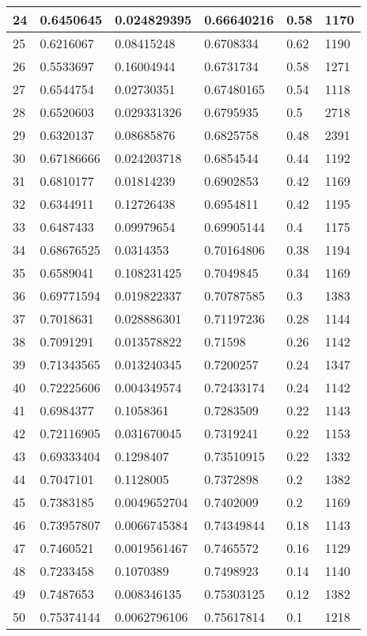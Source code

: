 \begin{longtable}{|l|l|l|l|l|l|}
24 & 0.6450645 & 0.024829395 & 0.66640216 & 0.58 & 1170 \\ \hline 
25 & 0.6216067 & 0.08415248 & 0.6708334 & 0.62 & 1190 \\ \hline 
26 & 0.5533697 & 0.16004944 & 0.6731734 & 0.58 & 1271 \\ \hline 
27 & 0.6544754 & 0.02730351 & 0.67480165 & 0.54 & 1118 \\ \hline 
28 & 0.6520603 & 0.029331326 & 0.6795935 & 0.5 & 2718 \\ \hline 
29 & 0.6320137 & 0.08685876 & 0.6825758 & 0.48 & 2391 \\ \hline 
30 & 0.67186666 & 0.024203718 & 0.6854544 & 0.44 & 1192 \\ \hline 
31 & 0.6810177 & 0.01814239 & 0.6902853 & 0.42 & 1169 \\ \hline 
32 & 0.6344911 & 0.12726438 & 0.6954811 & 0.42 & 1195 \\ \hline 
33 & 0.6487433 & 0.09979654 & 0.69905144 & 0.4 & 1175 \\ \hline 
34 & 0.68676525 & 0.0314353 & 0.70164806 & 0.38 & 1194 \\ \hline 
35 & 0.6589041 & 0.108231425 & 0.7049845 & 0.34 & 1169 \\ \hline 
36 & 0.69771594 & 0.019822337 & 0.70787585 & 0.3 & 1383 \\ \hline 
37 & 0.7018631 & 0.028886301 & 0.71197236 & 0.28 & 1144 \\ \hline 
38 & 0.7091291 & 0.013578822 & 0.71598 & 0.26 & 1142 \\ \hline 
39 & 0.71343565 & 0.013240345 & 0.7200257 & 0.24 & 1347 \\ \hline 
40 & 0.72225606 & 0.004349574 & 0.72433174 & 0.24 & 1142 \\ \hline 
41 & 0.6984377 & 0.1058361 & 0.7283509 & 0.22 & 1143 \\ \hline 
42 & 0.72116905 & 0.031670045 & 0.7319241 & 0.22 & 1153 \\ \hline 
43 & 0.69333404 & 0.1298407 & 0.73510915 & 0.22 & 1332 \\ \hline 
44 & 0.7047101 & 0.1128005 & 0.7372898 & 0.2 & 1382 \\ \hline 
45 & 0.7383185 & 0.0049652704 & 0.7402009 & 0.2 & 1169 \\ \hline 
46 & 0.73957807 & 0.0066745384 & 0.74349844 & 0.18 & 1143 \\ \hline 
47 & 0.7460521 & 0.0019561467 & 0.7465572 & 0.16 & 1129 \\ \hline 
48 & 0.7233458 & 0.1070389 & 0.7498923 & 0.14 & 1140 \\ \hline 
49 & 0.7487653 & 0.008346135 & 0.75303125 & 0.12 & 1382 \\ \hline 
50 & 0.75374144 & 0.0062796106 & 0.75617814 & 0.1 & 1218 \\ \hline 
\end{longtable}
